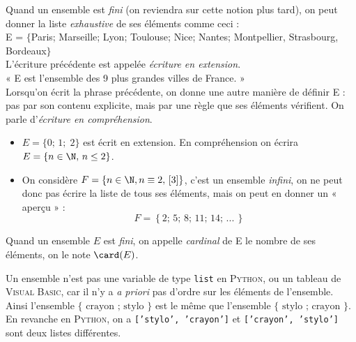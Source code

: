 \begin{definition}

    Quand un ensemble est \textit{fini} (on reviendra sur cette notion plus tard), on peut donner la liste \textit{exhaustive} de ses éléments comme ceci :\\

    E = $\lbrace $Paris; Marseille; Lyon; Toulouse; Nice; Nantes; Montpellier, Strasbourg, Bordeaux$\rbrace$\\
    L'écriture précédente est appelée \textit{écriture en extension}.\\

    « E est l'ensemble des 9 plus grandes villes de France. » \\
    Lorsqu'on écrit la phrase précédente, on donne une autre manière de définir E : pas par son contenu explicite, mais par une règle que ses éléments vérifient. On parle d'\textit{écriture en compréhension}.
\end{definition}

\begin{exemple}[s]
    \begin{itemize}
        \item 	$E=\lbrace 0;\,1;\;2\rbrace$ est écrit en extension. En compréhension on écrira $E=\lbrace n\in\N,\,n\leq 2\rbrace$.
        \item 	On considère $F=\lbrace n\in\N, n\equiv 2,\,[3]\rbrace$, c'est un ensemble \textit{infini}, on ne peut donc pas écrire la liste de tous ses éléments, mais on peut en donner un « aperçu »  :
              $$F=\left\lbrace 2;\,5;\,8;\,11;\,14;\,...\,\right\rbrace$$
    \end{itemize}
\end{exemple}

\begin{definition}[]
    Quand un ensemble $E$ est \textit{fini}, on appelle \textit{cardinal} de E le nombre de ses éléments, on le note $\card(E)$.
\end{definition}

\begin{remarque}[]
    Un ensemble n'est pas une variable de type \texttt{list} en \textsc{Python}, ou un tableau de \textsc{Visual Basic}, car il n'y a \textit{a priori} pas d'ordre sur les éléments de l'ensemble.\\
    Ainsi l'ensemble $\lbrace \text{ crayon ; stylo }\rbrace$ est le même que l'ensemble $\lbrace \text{ stylo ; crayon }\rbrace$.\\
    En revanche en \textsc{Python}, on a \texttt{['stylo', 'crayon']} et \texttt{['crayon', 'stylo']} sont deux listes différentes.


\end{remarque}

